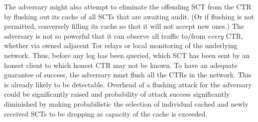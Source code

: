  The adversary might also attempt to
eliminate the offending SCT from the CTR by flushing out its cache of
all SCTs that are awaiting audit\@. (Or if flushing is not permitted,
conversely filling its cache so that it will not accept new ones.) The
adversary is not so powerful that it can observe all traffic to/from
\emph{every} CTR, whether via owned adjacent Tor relays or local
monitoring of the underlying network.  Thus, before any log has been
queried, which SCT has been sent by an honest client to which honest
CTR may not be known. To have an adequate guarantee of success, the
adversary must flush all the CTRs in the network. This is already
likely to be detectable. Overhead of a flushing attack for the
adversary could be significantly raised and probability of attack
success significantly diminished by making probabilistic the selection
of individual cached and newly received SCTs to be dropping as
capacity of the cache is exceeded.



